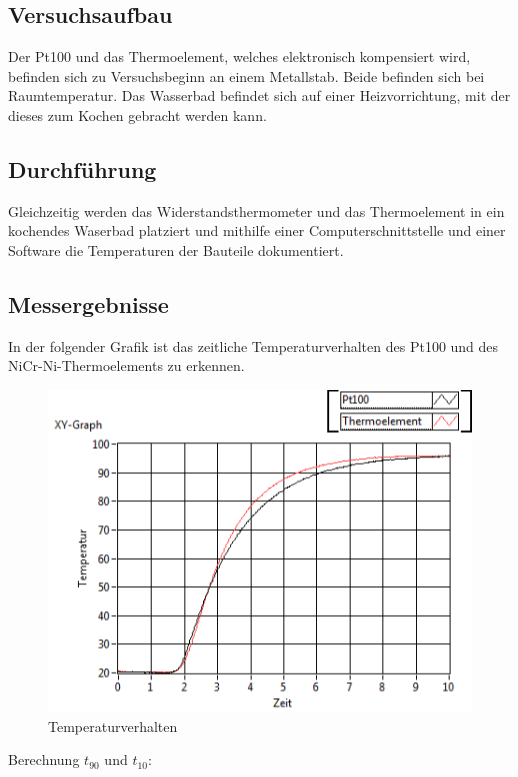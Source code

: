 \documentclass[a4paper,11pt,oneside]{article}
\begin{document}
\subsection{Versuchsaufbau}
Der Pt100 und das Thermoelement, welches elektronisch kompensiert wird, befinden sich zu Versuchsbeginn an einem Metallstab. Beide befinden sich bei Raumtemperatur. Das Wasserbad befindet sich auf einer Heizvorrichtung, mit der dieses zum Kochen gebracht werden kann. 
\subsection{Durchführung}
Gleichzeitig werden das Widerstandsthermometer und das Thermoelement in ein kochendes Waserbad platziert und mithilfe einer Computerschnittstelle und einer Software die Temperaturen der Bauteile dokumentiert. 
\subsection{Messergebnisse}
In der folgender Grafik ist das zeitliche Temperaturverhalten des Pt100 und des NiCr-Ni-Thermoelements zu erkennen.
\begin{center}
\begin{figure}[hbtp]
\centering
\includegraphics[scale=1]{Bilder/temperaturverhalten.png}
\caption{Temperaturverhalten}
\end{figure}
\end{center}
Berechnung $t_{90}$ und $t_{10}$:\\
\end{document}
